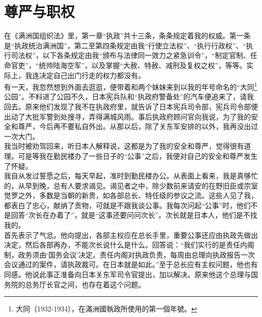 \fancyhead[RO]{\thepage} %
\fancyhead[LE]{\thepage} %
\chapter*{尊严与职权}
在《满洲国组织法》里，第一章“执政”共十三条，条条规定着我的权威。第一条是“执政统治满洲国”，第二至第四条规定由我“行使立法权”、“执行行政权”、“执行司法权”，以下各条规定由我“颁布与法律同一效力之紧急训令”，“制定官制、任命官吏”，“统帅陆海空军”，以及掌握“大赦、特赦、减刑及复权之权”，等等。实际上，我连决定自己出门行走的权力都没有。\\

有一天，我忽然想到外面去逛逛，便带着和两个妹妹来到以我的年号命名的“大同\footnote{大同（1932-1934），在滿洲國執政所使用的第一個年號。}公园”。不料进了公园不久，日本宪兵队和“执政府警备处”的汽车便追来了，请我回去。原来他们发现了我不在执政府里，就告诉了日本宪兵司令部，宪兵司令部便出动了大批军警到处搜寻，弄得满城风雨。事后执政府顾问官向我说，为了我的安全和尊严，今后再不要私自外出。从那以后，除了关东军安排的以外，我再没出过一次大门。\\

我当时被劝驾回来，听日本人解释说，这都是为了我的安全和尊严，觉得很有道理。可是等我在勤民楼办了一些日子的“公事”之后，我便对自己的安全和尊严发生了怀疑。\\

我自从发过誓愿之后，每天早起，准时到勤民楼办公。从表面上看来，我是真够忙的，从早到晚，总有人要求谒见。谒见者之中，除少数前来请安的在野旧臣或宗室觉罗之外，多数是当朝的新贵，如各部总长、特任级的参议之流。这些人见了我，都表白了忠心，献纳了贡物，可就是不跟我谈公事。我每次问起“公事”时，他们不是回答“次长在办着了”，就是“这事还要问问次长”。次长就是日本人，他们是不找我的。\\

首先表示了气忿。他向提出，各部主权应在总长手里，重要公事还应由执政先做出决定，然后各部再办，不能次长说什么是什么。回答说：“我们实行的是责任内阁制，政务须由‘国务会议’决定。责任内阁对执政负责，每周由总理向执政报告一次会议通过的案件，请执政裁可。在日本就是如此。”至于总长应有主权问题，他也有同感。他说此事正准备向日本关东军司令官提出，加以解决。原来他这个总理与国务院的总务厅长官之间，也存在着这个问题。\\

